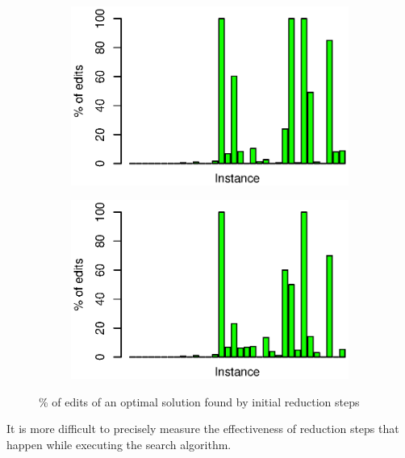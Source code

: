 \documentclass{article}
\theoremstyle{definition}
\begin{document}
\begin{figure}[h]
	\begin{subfigure}{0.49\textwidth}
		\includegraphics[width=1.0\linewidth]{percent_edits_full}
	\end{subfigure}
	\begin{subfigure}{0.49\textwidth}
		\includegraphics[width=1.0\linewidth]{percent_edits_rules1-5}
	\end{subfigure}
	\caption{\% of edits of an optimal solution found by initial reduction steps}
	\label{fig:edits from reduction}
\end{figure}

It is more difficult to precisely measure the effectiveness of reduction steps that happen while
executing the search algorithm. 

\end{document}

